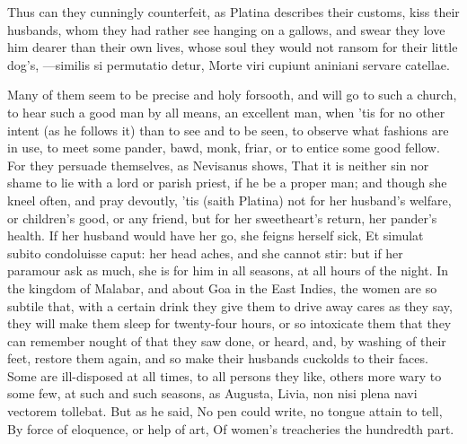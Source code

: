 {Thus can they cunningly counterfeit, as Platina describes their
customs, kiss their husbands, whom they had rather see hanging on a
gallows, and swear they love him dearer than their own lives, whose
soul they would not ransom for their little dog's,
---similis si permutatio detur,
Morte viri cupiunt aniniani servare catellae.

Many of them seem to be precise and holy forsooth, and will go to such
a church, to hear such a good man by all means, an excellent man,
when 'tis for no other intent (as he follows it) than to see and to be
seen, to observe what fashions are in use, to meet some pander, bawd,
monk, friar, or to entice some good fellow. For they persuade
themselves, as  Nevisanus shows, That it is neither sin nor shame
to lie with a lord or parish priest, if he be a proper man; and
though she kneel often, and pray devoutly, 'tis (saith Platina) not for
her husband's welfare, or children's good, or any friend, but for her
sweetheart's return, her pander's health. If her husband would have her
go, she feigns herself sick, Et simulat subito condoluisse caput:
her head aches, and she cannot stir: but if her paramour ask as much,
she is for him in all seasons, at all hours of the night. In the
kingdom of Malabar, and about Goa in the East Indies, the women are so
subtile that, with a certain drink they give them to drive away cares
as they say, they will make them sleep for twenty-four hours, or
so intoxicate them that they can remember nought of that they saw done,
or heard, and, by washing of their feet, restore them again, and so
make their husbands cuckolds to their faces. Some are ill-disposed at
all times, to all persons they like, others more wary to some few, at
such and such seasons, as Augusta, Livia, non nisi plena navi vectorem
tollebat. But as he said,
No pen could write, no tongue attain to tell,
By force of eloquence, or help of art,
Of women's treacheries the hundredth part.

}
